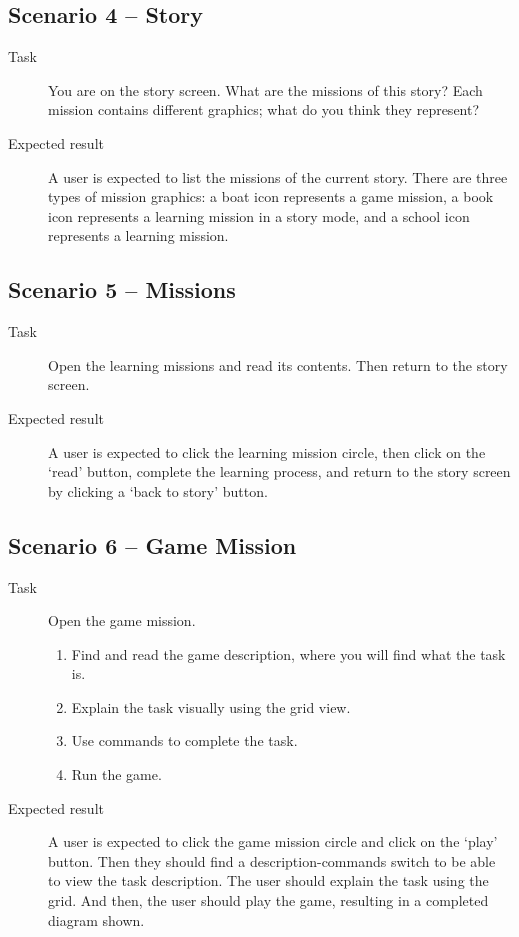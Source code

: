 \subsection*{Scenario 4 -- Story}

\begin{description}
    \item[Task] You are on the story screen.
    What are the missions of this story?
    Each mission contains different graphics; what do you think they represent?
    \item[Expected result] A user is expected to list the missions of the current story.
    There are three types of mission graphics: a boat icon represents a game mission, a book icon represents a learning mission in a story mode, and a school icon represents a learning mission.
\end{description}

\subsection*{Scenario 5 -- Missions}

\begin{description}
    \item[Task] Open the learning missions and read its contents.
    Then return to the story screen.
    \item[Expected result] A user is expected to click the learning mission circle, then click on the \enquote*{read} button, complete the learning process, and return to the story screen by clicking a \enquote*{back to story} button.
\end{description}

\subsection*{Scenario 6 -- Game Mission}

\begin{description}
    \item[Task] Open the game mission.
    \begin{enumerate}
        \item Find and read the game description, where you will find what the task is.
        \item Explain the task visually using the grid view.
        \item Use commands to complete the task.
        \item Run the game.
    \end{enumerate}
    \item[Expected result] A user is expected to click the game mission circle and click on the \enquote*{play} button.
    Then they should find a description-commands switch to be able to view the task description.
    The user should explain the task using the grid.
    And then, the user should play the game, resulting in a completed diagram shown.
\end{description}

